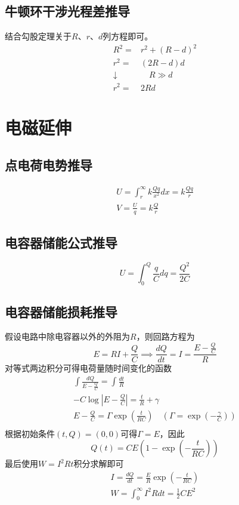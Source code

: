 \subsection{牛顿环干涉光程差推导}

结合勾股定理关于$R$、$r$、$d$列方程即可。
\begin{align*}
    R^2=&r^2+(R-d)^2\\
    r^2=&(2R-d)d\\
    \downarrow&\quad R\gg d\\
    r^2=&2Rd
\end{align*}

\section{电磁延伸}

\subsection{点电荷电势推导}

\begin{gather*}
    U=\int_r^\infty k\frac{Qq}{x^2}dx=k\frac{Qq}{r}\\
    V=\frac{U}{q}=k\frac{Q}{r}
\end{gather*}

\subsection{电容器储能公式推导}

\begin{equation*}
    U=\int_0^Q\frac{q}{C}dq=\frac{Q^2}{2C}
\end{equation*}

\subsection{电容器储能损耗推导}

假设电路中除电容器以外的外阻为$R$，则回路方程为
\begin{equation*}
    E=RI+\frac{Q}{C}\implies
    \frac{dQ}{dt}=I=\frac{E-\frac{Q}{C}}{R}
\end{equation*}
对等式两边积分可得电荷量随时间变化的函数
\begin{gather*}
    \int\frac{dQ}{E-\frac{Q}{C}}=\int\frac{dt}{R}\\
    -C\log\left\lvert E-\frac{Q}{C}\right\rvert=\frac{t}{R}+\gamma\\
    E-\frac{Q}{C}=\Gamma\exp\left(\frac{t}{RC}\right)\quad\left(\Gamma=\exp\left(-\frac{\gamma}{C}\right)\right)\\
\end{gather*}
根据初始条件$(t,Q)=(0,0)$可得$\Gamma=E$，因此
\begin{equation*}
    Q(t)=CE\left(1-\exp\left(-\frac{t}{RC}\right)\right)
\end{equation*}
最后使用$W=I^2Rt$积分求解即可
\begin{gather*}
    I=\frac{dQ}{dt}=\frac{E}{R}\exp\left(-\frac{t}{RC}\right)\\
    W=\int_0^\infty I^2Rdt=\frac12CE^2
\end{gather*}

